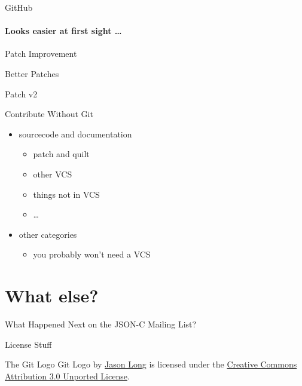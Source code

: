 \documentclass{beamer}
\begin{document}
\begin{frame}{GitHub}
    \framesubtitle{Looks easier at first sight \dots}
    
\end{frame}

\begin{frame}{Patch Improvement}
    \begin{block}{Better Patches}
    \end{block}
    \pause
    \begin{block}{Patch v2}
    \end{block}
\end{frame}

\begin{frame}{Contribute Without Git}
    \begin{itemize}
        \item sourcecode and documentation
        \begin{itemize}
            \item patch and quilt
            \item other VCS
            \item things not in VCS
            \item \dots
        \end{itemize}
        \item other categories
        \begin{itemize}
            \item you probably won't need a VCS
        \end{itemize}
    \end{itemize}
\end{frame}

\section*{What else?}

\begin{frame}{What Happened Next on the JSON-C Mailing List?}
\end{frame}

\begin{frame}{License Stuff}
    \begin{block}{The Git Logo}
        Git Logo by \href{http://twitter.com/jasonlong}{Jason Long} is
        licensed under the
        \href{http://creativecommons.org/licenses/by/3.0/}{Creative Commons Attribution 3.0 Unported License}.
    \end{block}
\end{frame}
\end{document}
